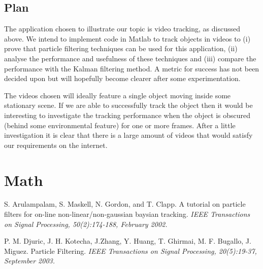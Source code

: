 \documentclass[11pt]{article}
\begin{document}
\subsection{Plan}
The application chosen to illustrate our topic is video tracking, as discussed
above. We intend to implement code in Matlab to track objects in videos to (i)
prove that particle filtering techniques can be used for this application,
(ii) analyse the performance and usefulness of these techniques and (iii)
compare the performance with the Kalman filtering method. A metric for success
has not been decided upon but will hopefully become clearer after some
experimentation.

The videos chosen will ideally feature a single object moving inside some
stationary scene. If we are able to successfully track the object then it would
be interesting to investigate the tracking performance when the object is
obscured (behind some environmental feature) for one or more frames. After a
little investigation it is clear that there is a large amount of videos that
would satisfy our requirements on the internet.

\section{Math}

\begin{thebibliography}{99}
 S. Arulampalam, S. Maskell, N. Gordon, and T. Clapp. A tutorial
on particle filters for on-line non-linear/non-gaussian baysian tracking.
\emph{IEEE Transactions on Signal Processing, 50(2):174-188, February 2002.}

 P. M. Djuric, J. H. Kotecha, J.Zhang, Y. Huang, T. Ghirmai, M.
F. Bugallo, J. Miguez. Particle Filtering. \emph{IEEE Transactions on Signal
Processing, 20(5):19-37, September 2003.}
\end{thebibliography}
\end{document}
